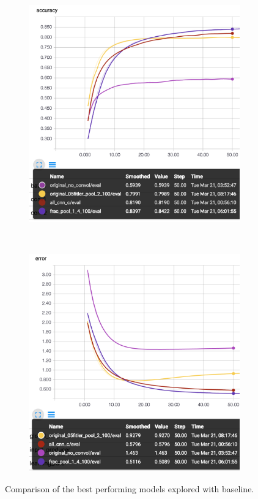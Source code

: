 \documentclass[12pt]{article}
\begin{document}
\begin{figure}[ht!]
    \centering
    \begin{subfigure}[t]{0.475\textwidth}
        \centering
        \includegraphics[width=1.0\linewidth]{rescompa.png}
    \end{subfigure}%
    ~ 
    \begin{subfigure}[t]{0.475\textwidth}
        \centering
        \includegraphics[width=1.0\linewidth]{rescompe.png}
    \end{subfigure}
    \caption{Comparison of the best performing models explored with baseline.}
    \label{fig:rescomp}
\end{figure}
\end{document}
